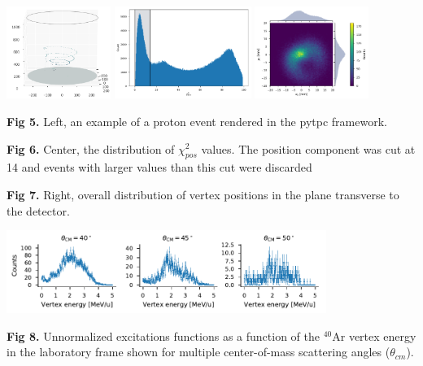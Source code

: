 \documentclass[ansiepaper,portrait]{baposter}
\begin{document}
\begin{poster}
{\begin{center}
\includegraphics[height=30mm]{chamber_plot.png}
\hspace{.75cm}
\includegraphics [height=30mm] {chi2pos.pdf}
\hspace{.75cm}
\includegraphics [height=30mm] {vertex_pos_distrib.pdf}
\end{center}

\small{\textbf{Fig 5.} Left, an example of a proton event rendered in the pytpc framework.}

\small{\textbf{Fig 6.} Center, the distribution of $\chi_{pos}^{2}$ values. The position component was cut at 14 and events with larger values than this cut were discarded}

\small{\textbf{Fig 7.} Right, overall distribution of vertex positions in the plane transverse to the detector.}

\begin{center}
\includegraphics [width=104mm] {angular_excitation_hists_POSTER.pdf}
\end{center}
\small{\textbf{Fig 8.} Unnormalized excitations functions as a function of the $^{40}$Ar vertex energy in the laboratory frame shown for multiple center-of-mass scattering angles ($\theta_{cm}$).}
}


\end{poster}
\end{document}
